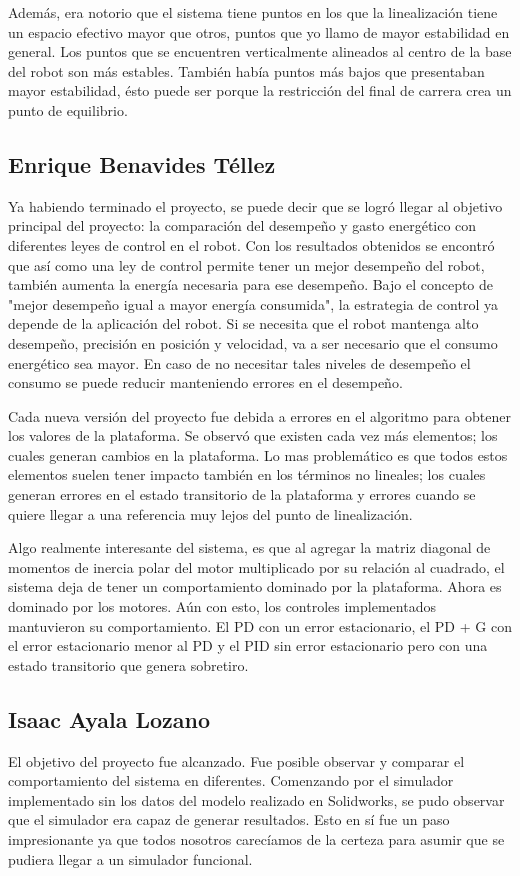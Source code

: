 Además, era notorio que el sistema tiene puntos en los que la linealización tiene un espacio efectivo mayor que otros, puntos que yo llamo de mayor estabilidad en general.
Los puntos que se encuentren verticalmente alineados al centro de la base del robot son más estables.
También había puntos más bajos que presentaban mayor estabilidad, ésto puede ser porque la restricción del final de carrera crea un punto de equilibrio.


\subsection{Enrique Benavides Téllez}
Ya habiendo terminado el proyecto, se puede decir que se logró llegar al objetivo principal del proyecto: la comparación del desempeño y gasto energético con diferentes leyes de control en el robot. 
Con los resultados obtenidos se encontró que así como una ley de control permite tener un mejor desempeño del robot, también aumenta la energía necesaria para ese desempeño.
Bajo el concepto de "mejor desempeño igual a mayor energía consumida", la estrategia de control ya depende de la aplicación del robot. 
Si se necesita que el robot mantenga alto desempeño, precisión en posición y velocidad, va a ser necesario que el consumo energético sea mayor.
En caso de no necesitar tales niveles de desempeño el consumo se puede reducir manteniendo errores en el desempeño.

Cada nueva versión del proyecto fue debida a errores en el algoritmo para obtener los valores de la plataforma. 
Se observó que existen cada vez más elementos; los cuales generan cambios en la plataforma. 
Lo mas problemático es que todos estos elementos suelen tener impacto también en los términos no lineales; 
los cuales generan errores en el estado transitorio de la plataforma y errores cuando se quiere llegar a una referencia muy lejos del punto de linealización.

Algo realmente interesante del sistema, es que al agregar la matriz diagonal de momentos de inercia polar del motor multiplicado por su relación al cuadrado, el sistema deja de tener un comportamiento dominado por la plataforma. 
Ahora es dominado por los motores.
Aún con esto, los controles implementados mantuvieron su comportamiento. El PD con un error estacionario, el PD + G con el error estacionario menor al PD y el PID sin error estacionario pero con una estado transitorio que genera sobretiro.

\subsection{Isaac Ayala Lozano}
El objetivo del proyecto fue alcanzado. 
Fue posible observar y comparar el comportamiento del sistema 
en diferentes. 
Comenzando por el simulador implementado sin los datos del modelo realizado en Solidworks, se pudo observar que el simulador era capaz de generar resultados.
Esto en sí fue un paso impresionante ya que todos nosotros carecíamos de la certeza para asumir que se pudiera llegar a un simulador funcional.

